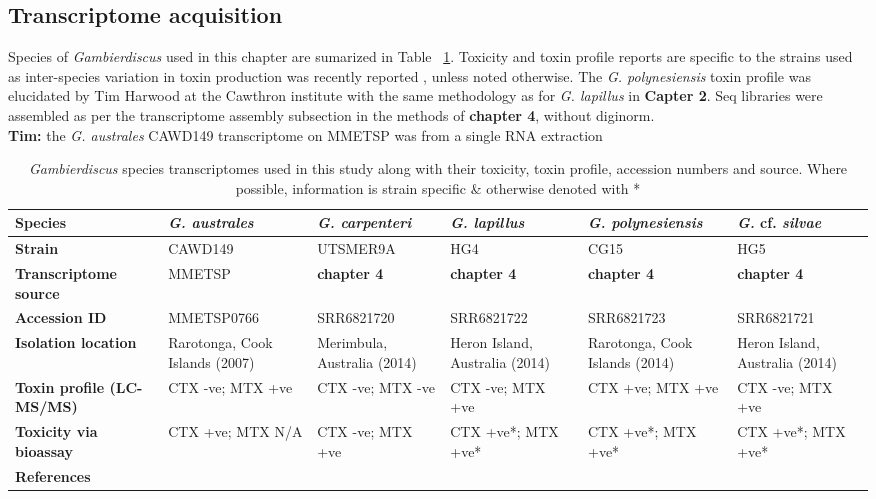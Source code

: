 \documentclass[12pt]{article}
\begin{document}
\subsection*{Transcriptome acquisition}
Species of \textit{Gambierdiscus} used in this chapter are sumarized in Table ~\ref{tbl:StrainTable}. 
Toxicity and toxin profile reports are specific to the strains used as inter-species variation in toxin production was recently reported \cite{larsson2018toxicology,rhodes2017epiphytic}, unless noted otherwise. 
The \textit{G. polynesiensis} toxin profile was elucidated by Tim Harwood at the Cawthron institute with the same methodology as for \textit{G. lapillus} in \textbf{Capter 2}. 
Seq libraries were assembled as per the transcriptome assembly subsection in the methods of \textbf{chapter 4}, without diginorm. \\
\textbf{Tim:} the \textit{G. australes} CAWD149 transcriptome on MMETSP was from a single RNA extraction

\FloatBarrier
\begin{table}
\caption{\emph{Gambierdiscus} species transcriptomes used in this study along with their toxicity, toxin profile, accession numbers and source. Where possible, information is strain specific \& otherwise denoted with *}
\label{tbl:StrainTable}
\begin{tabular}{ | p{2.5cm} | p{2.3cm} | p{2.3cm} | p{2.3cm} | p{2.3cm} | p{2.3cm}|}
\hline
\textbf{Species}&\textit{G. australes}&\textit{G. carpenteri}&\textit{G. lapillus}&\textit{G. polynesiensis}&\textit{G.} cf. \textit{silvae}\\
\hline
\textbf{Strain}&CAWD149&UTSMER9A&HG4&CG15&HG5\\
\hline
\textbf{Transcriptome source}&MMETSP&\textbf{chapter 4}&\textbf{chapter 4}&\textbf{chapter 4}&\textbf{chapter 4}\\
\hline
\textbf{Accession ID}&MMETSP0766&SRR6821720&SRR6821722&SRR6821723&SRR6821721\\
\hline
\textbf{Isolation location}&Rarotonga, Cook Islands (2007)&Merimbula, Australia (2014)&Heron Island, Australia (2014)&Rarotonga, Cook Islands (2014)&Heron Island, Australia (2014)\\
\hline
\textbf{Toxin profile (LC-MS/MS)}&CTX -ve; MTX +ve&CTX -ve; MTX -ve&CTX -ve; MTX +ve&CTX +ve; MTX +ve&CTX -ve; MTX +ve\\
\hline
\textbf{Toxicity via bioassay}&CTX +ve; MTX N/A&CTX -ve; MTX +ve&CTX +ve*; MTX +ve*&CTX +ve*; MTX +ve*&CTX +ve*; MTX +ve*\\
\hline
\textbf{References}&\cite{keeling2014marine,rhodes2010toxic,munday2017ciguatoxins}&\cite{larsson2018toxicology}&\cite{larsson2018toxicology,kretzschmar2017characterization}&&\cite{larsson2018toxicology,kretzschmar2017characterization}\\
\hline
\end{tabular}
\end{table}
\FloatBarrier
\end{document}
